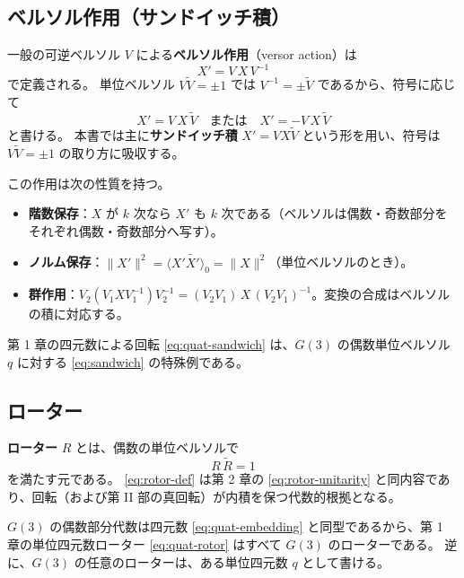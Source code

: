 \documentclass[dvipdfmx,a4paper,oneside]{jsbook}
\numberwithin{equation}{chapter}
\begin{document}
\subsection{ベルソル作用（サンドイッチ積）}

一般の可逆ベルソル \(V\) による\textbf{ベルソル作用}（versor action）は
\begin{equation}
  X' = V\,X\,V^{-1}
  \label{eq:versor-action}
\end{equation}
で定義される。
単位ベルソル \(V\widetilde{V}=\pm 1\) では \(V^{-1} = \pm\widetilde{V}\) であるから、符号に応じて
\begin{equation}
  X' = V\,X\,\widetilde{V}
  \quad\text{または}\quad
  X' = -V\,X\,\widetilde{V}
  \label{eq:sandwich}
\end{equation}
と書ける。
本書では主に\textbf{サンドイッチ積} \(X' = V X \widetilde{V}\) という形を用い、符号は \(V\widetilde{V}=\pm 1\) の取り方に吸収する。

この作用は次の性質を持つ。
\begin{itemize}[leftmargin=2em]
  \item \textbf{階数保存}：\(X\) が \(k\) 次なら \(X'\) も \(k\) 次である（ベルソルは偶数・奇数部分をそれぞれ偶数・奇数部分へ写す）。
  \item \textbf{ノルム保存}：\(\|X'\|^2 = \langle X'\widetilde{X'}\rangle_0 = \|X\|^2\)（単位ベルソルのとき）。
  \item \textbf{群作用}：\(V_2(V_1 X V_1^{-1})V_2^{-1} = (V_2 V_1)\,X\,(V_2 V_1)^{-1}\)。変換の合成はベルソルの積に対応する。
\end{itemize}
第 1 章の四元数による回転 \eqref{eq:quat-sandwich} は、\(G(3)\) の偶数単位ベルソル \(q\) に対する \eqref{eq:sandwich} の特殊例である。

\subsection{ローター}

\textbf{ローター} \(R\) とは、偶数の単位ベルソルで
\begin{equation}
  R\,\widetilde{R} = 1
  \label{eq:rotor-def}
\end{equation}
を満たす元である。
\eqref{eq:rotor-def} は第 2 章の \eqref{eq:rotor-unitarity} と同内容であり、回転（および第 II 部の真回転）が内積を保つ代数的根拠となる。

\(G(3)\) の偶数部分代数は四元数 \eqref{eq:quat-embedding} と同型であるから、第 1 章の単位四元数ローター \eqref{eq:quat-rotor} はすべて \(G(3)\) のローターである。
逆に、\(G(3)\) の任意のローターは、ある単位四元数 \(q\) として書ける。
\end{document}
